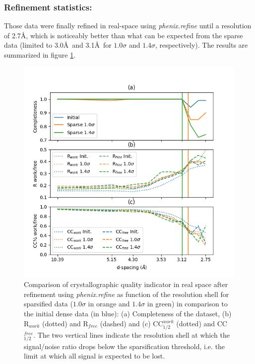 \documentclass[preprint]{iucr}              %
\begin{document}
\subsubsection{Refinement statistics:}

Those data were finally refined in real-space using \textit{phenix.refine} \cite{phenix} until a resolution of 2.7\AA, which is noticeably better than what can be expected from the sparse data (limited to 3.0\AA ~and 3.1\AA ~for $1.0\sigma$ and $1.4\sigma$, respectively). 
The results are summarized in figure \ref{r-NQO1}.

\begin{figure}
\label{r-NQO1}
\includegraphics[width=12cm]{NQO1/NQO1_refine}
\caption{Comparison of crystallographic quality indicator in real space after refinement using \textit{phenix.refine} as function of the resolution shell for sparsified data ($1.0\sigma$ in orange and $1.4\sigma$ in green) in comparison to the initial dense data (in blue):
(a) Completeness of the dataset, (b) R$_{work}$ (dotted) and R$_{free}$ (dashed) and (c) CC$_{1/2}^{work}$ (dotted) and CC$_{1/2}^{free}$.
The two vertical lines indicate the resolution shell at which the signal/noise ratio drops below the sparsification threshold, i.e. the limit at which all signal is expected to be lost.}
\end{figure}
\end{document}
